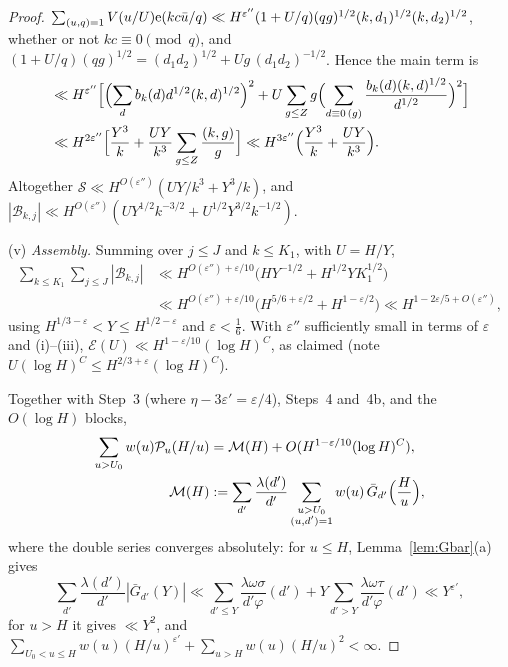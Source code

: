 \documentclass[11pt,a4paper]{article}
\theoremstyle{remark}\newtheorem{remark}[theorem]{Remark}
\begin{document}
\begin{proof}
$\sum_{(u,q)=1}V(u/U)\mathrm{e}(kc\bar u/q)\ll H^{\varepsilon''}(1+U/q)(qg)^{1/2}(k,d_1)^{1/2}(k,d_2)^{1/2}$, whether or not $kc\equiv0\pmod q$, and
$(1+U/q)(qg)^{1/2}=(d_1d_2)^{1/2}+Ug\,(d_1d_2)^{-1/2}$. Hence the main term is
\[
\begin{aligned}
&\ll H^{\varepsilon''}\Bigl[\Bigl(\sum_db_k(d)d^{1/2}(k,d)^{1/2}\Bigr)^2+U\sum_{g\le Z}g\Bigl(\sum_{d\equiv0\,(g)}\frac{b_k(d)(k,d)^{1/2}}{d^{1/2}}\Bigr)^2\Bigr]\\
&\ll H^{2\varepsilon''}\Bigl[\frac{Y^3}k+\frac{UY}{k^3}\sum_{g\le Z}\frac{(k,g)}g\Bigr]\ll H^{3\varepsilon''}\Bigl(\frac{Y^3}k+\frac{UY}{k^3}\Bigr).
\end{aligned}
\]
Altogether $\mathcal S\ll H^{O(\varepsilon'')}(UY/k^3+Y^3/k)$, and $|\mathcal B_{k,j}|\ll H^{O(\varepsilon'')}(UY^{1/2}k^{-3/2}+U^{1/2}Y^{3/2}k^{-1/2})$.

(v) \emph{Assembly.} Summing over $j\le J$ and $k\le K_1$, with $U=H/Y$,
\[
\begin{aligned}
\sum_{k\le K_1}\sum_{j\le J}|\mathcal B_{k,j}|&\ll H^{O(\varepsilon'')+\varepsilon/10}\bigl(HY^{-1/2}+H^{1/2}YK_1^{1/2}\bigr)\\
&\ll H^{O(\varepsilon'')+\varepsilon/10}\bigl(H^{5/6+\varepsilon/2}+H^{1-\varepsilon/2}\bigr)\ll H^{1-2\varepsilon/5+O(\varepsilon'')},
\end{aligned}
\]
using $H^{1/3-\varepsilon}<Y\le H^{1/2-\varepsilon}$ and $\varepsilon<\tfrac16$. With $\varepsilon''$ sufficiently small in terms of $\varepsilon$ and (i)--(iii),
$\mathcal E(U)\ll H^{1-\varepsilon/10}(\log H)^C$, as claimed (note $U(\log H)^C\le H^{2/3+\varepsilon}(\log H)^C$).

Together with Step~3 (where $\eta-3\varepsilon'=\varepsilon/4$), Steps~4 and~4b, and the $O(\log H)$ blocks,
\begin{align}\label{eq:MH}
\sum_{u>U_0}w(u)\mathcal P_u(H/u)&=\mathcal M(H)+O(H^{1-\varepsilon/10}(\log H)^C),\\
\mathcal M(H)&:=\sum_{d'}\frac{\lambda(d')}{d'}\sum_{\substack{u>U_0\\ (u,d')=1}}w(u)\,\bar G_{d'}\Bigl(\frac Hu\Bigr),\nonumber
\end{align}
where the double series converges absolutely: for $u\le H$, Lemma~\ref{lem:Gbar}(a) gives
\[
\sum_{d'}\frac{\lambda(d')}{d'}|\bar G_{d'}(Y)|\ll\sum_{d'\le Y}\frac{\lambda\omega\sigma}{d'\varphi}(d')+Y\sum_{d'>Y}\frac{\lambda\omega\tau}{d'\varphi}(d')\ll Y^{\varepsilon'},
\]
for $u>H$ it gives $\ll Y^2$, and $\sum_{U_0<u\le H}w(u)(H/u)^{\varepsilon'}+\sum_{u>H}w(u)(H/u)^2<\infty$.


\end{proof}
\end{document}
